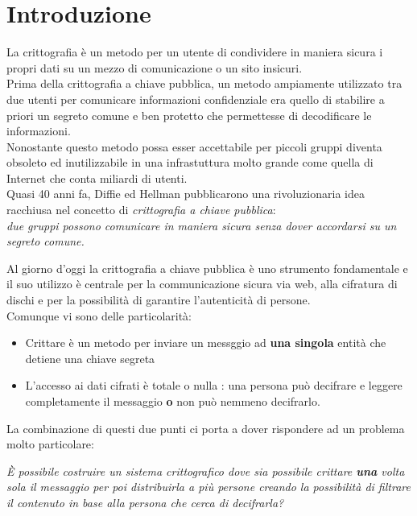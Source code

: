 
\chapter{Introduzione}


La crittografia è un metodo per un utente di condividere in maniera sicura i propri dati su un mezzo di comunicazione o un sito insicuri.\\
Prima della crittografia a chiave pubblica, un metodo ampiamente utilizzato tra due utenti per comunicare informazioni confidenziale era quello di stabilire a priori un segreto comune e ben protetto che permettesse di decodificare le informazioni.\\
Nonostante questo metodo possa esser accettabile per piccoli gruppi diventa obsoleto ed inutilizzabile in una infrastuttura molto grande come quella di Internet che conta miliardi di utenti.\\

Quasi 40 anni fa, Diffie ed Hellman pubblicarono una rivoluzionaria idea racchiusa nel concetto di \emph{crittografia a chiave pubblica}:\\
{ \itshape due gruppi possono comunicare in maniera sicura senza dover accordarsi su un segreto comune.}

\vspace{0.4cm}

Al giorno d'oggi la crittografia a chiave pubblica è uno strumento fondamentale e il suo utilizzo è centrale per la communicazione sicura via web, alla cifratura di dischi e per la possibilità di garantire l'autenticità di persone.\\
Comunque vi sono delle particolarità:
\begin{itemize}
	\item Crittare è un metodo per inviare un messggio ad \textbf{una singola} entità che detiene una chiave segreta
	\item L'accesso ai dati cifrati è totale o nulla : una persona può decifrare e leggere completamente il messaggio \textbf{o} non può nemmeno decifrarlo.
\end{itemize}

La combinazione di questi due punti ci porta a dover rispondere ad un problema molto particolare:

\begin{center}
{\itshape È possibile costruire un sistema crittografico dove sia possibile crittare \textbf{una} volta sola il messaggio per poi distribuirla a più persone creando la possibilità di filtrare il contenuto in base alla persona che cerca di decifrarla?}
\end{center}

